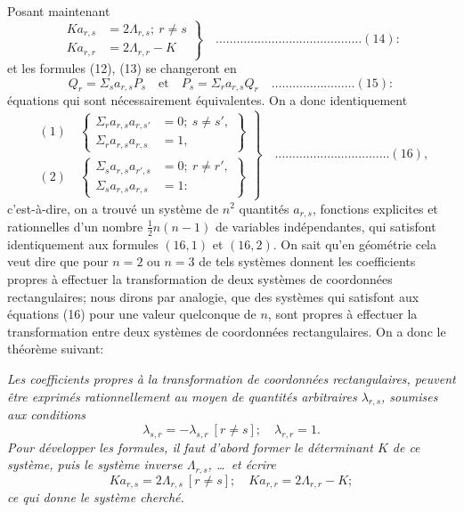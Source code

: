 \documentclass[11pt,a4paper]{book}
\begin{document}
Posant maintenant
\[
\left. \begin{aligned}
K a_{r,s} &= 2\Lambda_{r,s};\ r \neq s \\
K a_{r,r} &= 2\Lambda_{r,r} - K
\end{aligned} \right\} \quad \ldots \ldots \ldots \ldots \ldots \ldots \ldots \ldots \ldots \ldots \ldots \ldots \ldots \ldots (14):
\]
et les formules (12), (13) se changeront en
\[
Q_r = \Sigma_s a_{r,s} P_s \quad \text{et} \quad P_s = \Sigma_r a_{r,s} Q_r \quad \ldots \ldots \ldots \ldots \ldots \ldots \ldots \ldots (15):
\]
\'equations qui sont n\'ecessairement \'equivalentes. On a donc identiquement
\[
\left. \begin{aligned}
(1)\quad \left\{ \begin{aligned} \Sigma_r a_{r,s} a_{r,s'} &= 0;\ s \neq s', \\ \Sigma_r a_{r,s} a_{r,s} &= 1, \end{aligned} \right\} \\[6pt]
(2)\quad \left\{ \begin{aligned} \Sigma_s a_{r,s} a_{r',s} &= 0;\ r \neq r', \\ \Sigma_s a_{r,s} a_{r,s} &= 1: \end{aligned} \right\}
\end{aligned} \right\} \quad \ldots \ldots \ldots \ldots \ldots \ldots \ldots \ldots \ldots \ldots \ldots (16),
\]
c'est-\`a-dire, on a trouv\'e un syst\`eme de $n^2$ quantit\'es $a_{r,s}$, fonctions explicites et rationnelles d'un nombre $\frac{1}{2}n(n-1)$ de variables ind\'ependantes, qui satisfont identiquement aux formules $(16, 1)$ et $(16, 2)$. On sait qu'en g\'eom\'etrie cela veut dire que pour $n = 2$ ou $n = 3$ de tels syst\`emes donnent les coefficients propres \`a effectuer la transformation de deux syst\`emes de coordonn\'ees rectangulaires; nous dirons par analogie, que des syst\`emes qui satisfont aux \'equations (16) pour une valeur quelconque de $n$, sont propres \`a effectuer la transformation entre deux syst\`emes de coordonn\'ees rectangulaires. On a donc le th\'eor\`eme suivant:

\smallskip
\textit{Les coefficients propres \`a la transformation de coordonn\'ees rectangulaires, peuvent \^etre exprim\'es rationnellement au moyen de quantit\'es arbitraires $\lambda_{r,s}$, soumises aux conditions
\[
\lambda_{s,r} = -\lambda_{s,r}\ [r \neq s];\quad \lambda_{r,r} = 1.
\]
Pour d\'evelopper les formules, il faut d'abord former le d\'eterminant $K$ de ce syst\`eme, puis le syst\`eme inverse $\Lambda_{r,s}$, \ldots\ et \'ecrire
\[
K a_{r,s} = 2\Lambda_{r,s}\ [r \neq s];\quad K a_{r,r} = 2\Lambda_{r,r} - K;
\]
ce qui donne le syst\`eme cherch\'e.}
\smallskip
\end{document}
